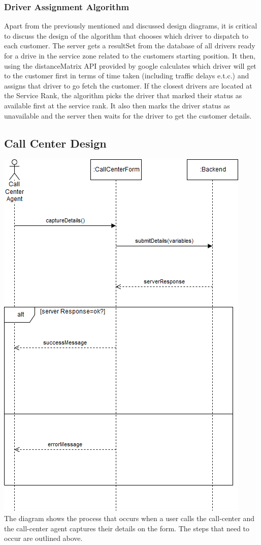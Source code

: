 \documentclass[a4paper,12pt]{article}
\begin{document}
\subsubsection{Driver Assignment Algorithm}
Apart from the previously mentioned and discussed design diagrams, it is critical to discuss the design of the algorithm that chooses which driver to dispatch to each customer. The server gets a resultSet from the database of all drivers ready for a drive in the service zone related to the customers starting position. It then, using the distanceMatrix API provided by google calculates which driver will get to the customer first in terms of time taken (including traffic delays e.t.c.) and assigns that driver to go fetch the customer. If the closest drivers are located at the Service Rank, the algorithm picks the driver that marked their status as available first at the service rank. It also then marks the driver status as unavailable and the server then waits for the driver to get the customer details.
\newpage
\subsection{Call Center Design}
\includegraphics[scale=0.5]{CallCenterSequence}\\
The diagram shows the process that occurs when a user calls the call-center and the call-center agent captures their details on the form. The steps that need to occur are outlined above.
\newpage
\end{document}
